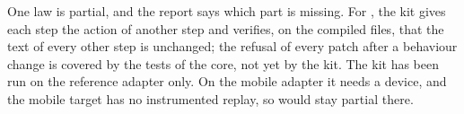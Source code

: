 One law is partial, and the report says which part is missing. For , the kit gives each step the action of another step and verifies, on the compiled files, that the text of every other step is unchanged; the refusal of every patch after a behaviour change is covered by the tests of the core, not yet by the kit. The kit has been run on the reference adapter only. On the mobile adapter it needs a device, and the mobile target has no instrumented replay, so  would stay partial there.
